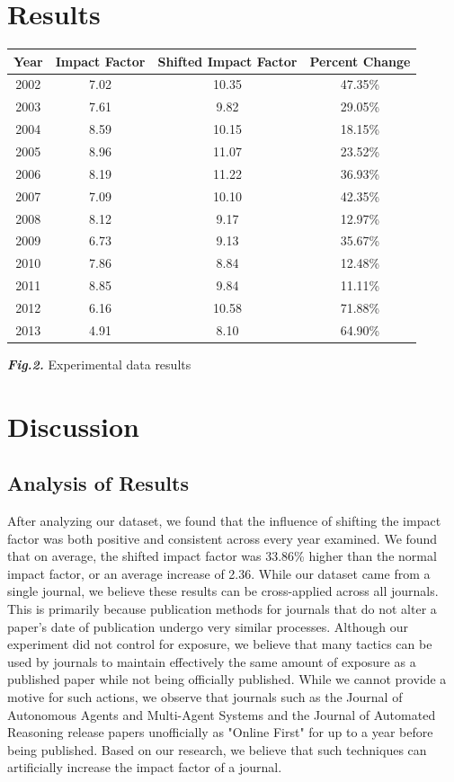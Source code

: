 \documentclass[times]{jtitauth}
\begin{document}
\section{Results}
\begin{center}
 \begin{tabular}{| c | c | c | c |} 
 \hline
 Year & Impact Factor & Shifted Impact Factor & Percent Change \\ 
 \hline\hline
 2002 & 7.02 & 10.35 & 47.35\%\\ 
 \hline
 2003 & 7.61 & 9.82 & 29.05\%\\
 \hline
 2004 & 8.59 & 10.15 & 18.15\%\\
 \hline
 2005 & 8.96 & 11.07 & 23.52\%\\
 \hline
 2006 & 8.19 & 11.22 & 36.93\%\\ 
 \hline
 2007 & 7.09 & 10.10 & 42.35\%\\ 
 \hline
 2008 & 8.12 & 9.17 & 12.97\%\\ 
 \hline
 2009 & 6.73 & 9.13 & 35.67\%\\ 
 \hline
 2010 & 7.86 & 8.84 & 12.48\%\\ 
 \hline
 2011 & 8.85 & 9.84 & 11.11\%\\ 
 \hline
 2012 & 6.16 & 10.58 & 71.88\%\\ 
 \hline
 2013 & 4.91 & 8.10 & 64.90\%\\ 
 \hline
\end{tabular}

\end{center}
\textbf{\textit{Fig.2.}}\hspace{.1cm} Experimental data results


\section{Discussion} 
\subsection{Analysis of Results}

After analyzing our dataset, we found that the influence of shifting the impact factor was both positive and consistent across every year examined. We found that on average, the shifted impact factor was 33.86\% higher than the normal impact factor, or an average increase of 2.36. While our dataset came from a single journal, we believe these results can be cross-applied across all journals. This is primarily because publication methods for journals that do not alter a paper's date of publication undergo very similar processes. Although our experiment did not control for exposure, we believe that many tactics can be used by journals to maintain effectively the same amount of exposure as a published paper while not being officially published. While we cannot provide a motive for such actions, we observe that journals such as the Journal of Autonomous Agents and Multi-Agent Systems and the Journal of Automated Reasoning release papers unofficially as "Online First" for up to a year before being published. Based on our research, we believe that such techniques can artificially increase the impact factor of a journal. 
\end{document}
